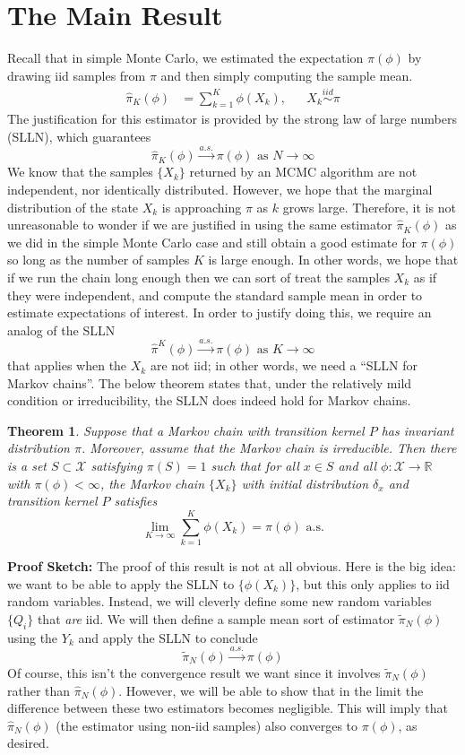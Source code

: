 \documentclass[12pt]{article}
\newcommand{\R}{\mathbb{R}}
\newtheorem{thm}{Theorem}
\begin{document}
\section{The Main Result}
Recall that in simple Monte Carlo, we estimated the expectation $\pi(\phi)$ by drawing iid samples from $\pi$ and then simply computing the sample mean. 
\begin{align*}
\hat{\pi}_K(\phi) &= \sum_{k = 1}^{K} \phi(X_k), && X_k \overset{iid}{\sim} \pi
\end{align*}
The justification for this estimator is provided by the strong law of large numbers (SLLN), which guarantees 
\[\hat{\pi}_K(\phi) \overset{a.s.}{\to} \pi(\phi) \text{ as } N \to \infty\]
We know that the samples $\{X_k\}$ returned by an MCMC algorithm are not independent, nor identically distributed. However, we hope that the marginal distribution of 
the state $X_k$ is approaching $\pi$ as $k$ grows large. Therefore, it is not unreasonable to wonder if we are justified in using the same estimator $\hat{\pi}_K(\phi)$ as we 
did in the simple Monte Carlo case and still obtain a good estimate for $\pi(\phi)$ so long as the number of samples $K$ is large enough. In other words, we hope that if we 
run the chain long enough then we can sort of treat the samples $X_k$ as if they were independent, and compute the standard sample mean in order to estimate expectations
of interest. In order to justify doing this, we require an analog of the SLLN 
\[\hat{\pi}^K(\phi) \overset{a.s.}{\to} \pi(\phi) \text{ as } K \to \infty\]
that applies when the $X_k$ are not iid; in other words, we need a ``SLLN for Markov chains''. The below theorem states that, under the relatively mild condition or irreducibility, the 
SLLN does indeed hold for Markov chains. 
\begin{thm} 
Suppose that a Markov chain with transition kernel $P$ has invariant distribution $\pi$. Moreover, assume that the Markov chain is irreducible. Then there is a set $S \subset \mathcal{X}$ 
satisfying $\pi(S) = 1$ such that for all $x \in S$ and all $\phi: \mathcal{X} \to \R$ with $\pi(\phi) < \infty$, the Markov chain $\{X_k\}$ with initial distribution $\delta_x$ and transition kernel $P$ 
satisfies
\[\lim_{K \to \infty} \sum_{k = 1}^{K} \phi(X_k) = \pi(\phi) \text{ a.s.} \]
\end{thm}

\bigskip
\noindent
\textbf{Proof Sketch:} The proof of this result is not at all obvious. Here is the big idea: we want to be able to apply the SLLN to $\{\phi(X_k)\}$, but this only applies to iid random variables. Instead, we will 
cleverly define some new random variables $\{Q_i\}$ that \textit{are} iid. We will then define a sample mean sort of estimator $\tilde{\pi}_N(\phi)$ using the $Y_k$ and apply the SLLN to conclude 
\[\tilde{\pi}_N(\phi) \overset{a.s.}{\to} \pi(\phi)\]
Of course, this isn't the convergence result we want since it involves $\tilde{\pi}_N(\phi)$ rather than $\hat{\pi}_N(\phi)$. However, we will be able to show that in the limit the difference between 
these two estimators becomes negligible. This will imply that $\hat{\pi}_N(\phi)$ (the estimator using non-iid samples) also converges to $\pi(\phi)$, as desired. 
\end{document}
